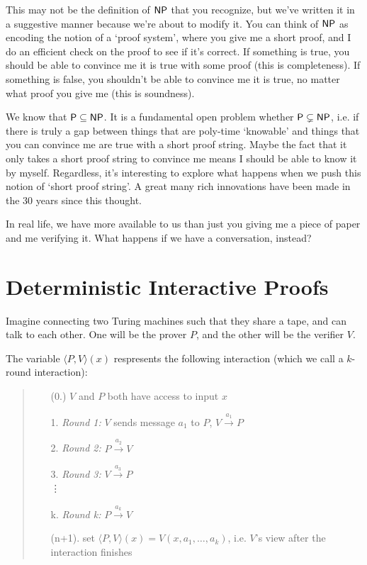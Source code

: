 \documentclass{article}
\begin{document}
This may not be the definition of $\mathsf{NP}$ that you recognize, but we've written it in a suggestive manner because we're about to modify it.
You can think of $\mathsf{NP}$ as encoding the notion of a `proof system', where you give me a short proof,
and I do an efficient check on the proof to see if it's correct.
If something is true, you should be able to convince me it is true with some proof (this is completeness).
If something is false, you shouldn't be able to convince me it is true, no matter what proof you give me (this is soundness). 

We know that $\mathsf{P} \subseteq \mathsf{NP}$. 
It is a fundamental open problem whether $\mathsf{P} \subsetneq \mathsf{NP}$, i.e. if there is truly a gap between things that are
poly-time `knowable' and things that you can convince me are true with a short proof string.
Maybe the fact that it only takes a short proof string to convince me means I should be able to know it by myself.
Regardless, it's interesting to explore what happens when we push this notion of `short proof string'.
A great many rich innovations have been made in the 30 years since this thought.

In real life, we have more available to us than just you giving me a piece of paper and me verifying it.
What happens if we have a conversation, instead?

\section{Deterministic Interactive Proofs}

Imagine connecting two Turing machines such that they share a tape, and can talk to each other.
One will be the prover $P$, and the other will be the verifier $V$.

\begin{definition}
The variable $\langle P, V \rangle(x)$ respresents the following interaction (which we call a \textnormal{$k$-round interaction}):
\begin{quote}
\begin{enumerate}
    \item[(0.)] $V$ and $P$ both have access to input $x$
    \item[1.] \textit{Round 1:} $V$ sends message $a_1$ to $P$, $V \stackrel{a_1}{\longrightarrow} P$
    \item[2.] \textit{Round 2:} $P \stackrel{a_2}{\longrightarrow} V$ 
    \item[3.] \textit{Round 3:} $V \stackrel{a_3}{\longrightarrow} P$\\
    \vdots 
    \item[k.] \textit{Round k:} $P \stackrel{a_k}{\longrightarrow} V$
    \item[(n+1).] set $ \langle P, V \rangle(x) = V(x, a_1, \ldots, a_k)$, i.e. $V$'s view after the interaction finishes
\end{enumerate}
\end{quote}
\end{definition}
\end{document}
